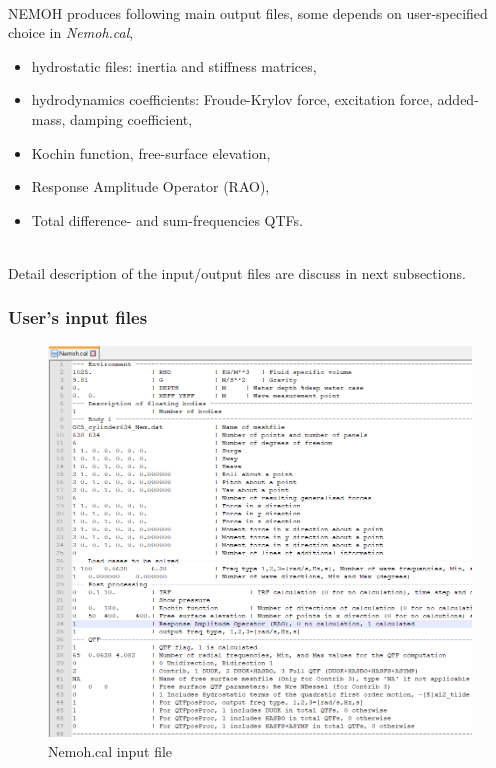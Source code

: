 \documentclass[12pt,a4paper,titlepage]{article}
\begin{document}
\ \\
NEMOH produces following main output files, some depends on user-specified choice in \textit{Nemoh.cal},
\begin{itemize}
\item hydrostatic files: inertia and stiffness matrices,
\item hydrodynamics coefficients: Froude-Krylov force, excitation force, added-mass, damping coefficient,
\item Kochin function, free-surface elevation,
\item Response Amplitude Operator (RAO),
\item Total difference- and sum-frequencies QTFs.
\end{itemize}
\ \\
Detail description of the input/output files are discuss in next subsections.

\subsubsection{User's input files}

\begin{figure}[ht]
\centering
\includegraphics[scale=0.8,trim = 0mm 0mm 12mm 0mm, clip]{figures/NemohCal.png}
\caption{Nemoh.cal input file}\label{fig:NemohCal}
\end{figure}
\end{document}
